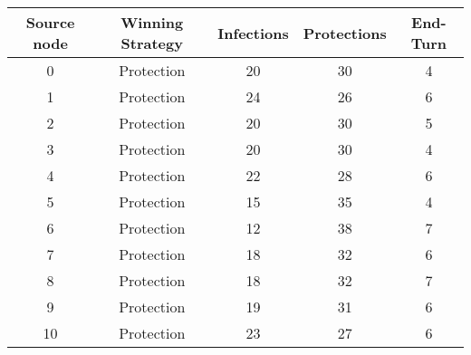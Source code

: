 \documentclass[results.tex]{subfiles}
\begin{document}
    \begin{center}
        \begin{tabular}{| c || c | c | c | c |}
            \hline
            {\bfseries Source node} & {\bfseries Winning Strategy} & {\bfseries Infections} & {\bfseries Protections}
            & {\bfseries End-Turn}
            \\  %
            \hline\hline
            0                       & Protection                   & 20                     & 30                      & 4                    \\
            \hline
            1                       & Protection                   & 24                     & 26                      & 6                    \\
            \hline
            2                       & Protection                   & 20                     & 30                      & 5                    \\
            \hline
            3                       & Protection                   & 20                     & 30                      & 4                    \\
            \hline
            4                       & Protection                   & 22                     & 28                      & 6                    \\
            \hline
            5                       & Protection                   & 15                     & 35                      & 4                    \\
            \hline
            6                       & Protection                   & 12                     & 38                      & 7                    \\
            \hline
            7                       & Protection                   & 18                     & 32                      & 6                    \\
            \hline
            8                       & Protection                   & 18                     & 32                      & 7                    \\
            \hline
            9                       & Protection                   & 19                     & 31                      & 6                    \\
            \hline
            10                      & Protection                   & 23                     & 27                      & 6                    \\

\end{tabular}
\end{center}
\end{document}
